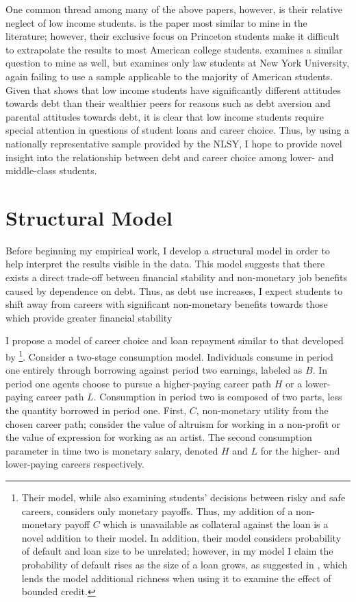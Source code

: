 \documentclass[12pt]{article}
\begin{document}
	One common thread among many of the above papers, however, is their relative neglect of low income students. \textcite{rothstein2011} is the paper most similar to mine in the literature; however, their exclusive focus on Princeton students make it difficult to extrapolate the results to most American college students. \textcite{field2009} examines a similar question to mine as well, but examines only law students at New York University, again failing to use a sample applicable to the majority of American students. Given that \textcite{callender2005} shows that low income students have significantly different attitudes towards debt than their wealthier peers for reasons such as debt aversion and parental attitudes towards debt, it is clear that low income students require special attention in questions of student loans and career choice. Thus, by using a nationally representative sample provided by the NLSY, I hope to provide novel insight into the relationship between debt and career choice among lower- and middle-class students.

	\section{Structural Model}
	
	Before beginning my empirical work, I develop a structural model in order to help interpret the results visible in the data. This model suggests that there exists a direct trade-off between financial stability and non-monetary job benefits caused by dependence on debt. Thus, as debt use increases, I expect students to shift away from careers with significant non-monetary benefits towards those which provide greater financial stability

	I propose a model of career choice and loan repayment similar to that developed by \textcite{abraham2018}
	\footnote{Their model, while also examining students' decisions between risky and safe careers, considers only monetary payoffs. Thus, my addition of a non-monetary payoff $C$ which is unavailable as collateral against the loan is a novel addition to their model. In addition, their model considers probability of default and loan size to be unrelated; however, in my model I claim the probability of default rises as the size of a loan grows, as suggested in \textcite{dynarski2015}, which lends the model additional richness when using it to examine the effect of bounded credit.}. 
	Consider a two-stage consumption model. Individuals consume in period one entirely through borrowing against period two earnings, labeled as $B$. In period one agents choose to pursue a higher-paying career path $H$ or a lower-paying career path $L$. Consumption in period two is composed of two parts, less the quantity borrowed in period one. First, $C$, non-monetary utility from the chosen career path; consider the value of altruism for working in a non-profit or the value of expression for working as an artist. The second consumption parameter in time two is monetary salary, denoted $H$ and $L$ for the higher- and lower-paying careers respectively.
	
\end{document}
